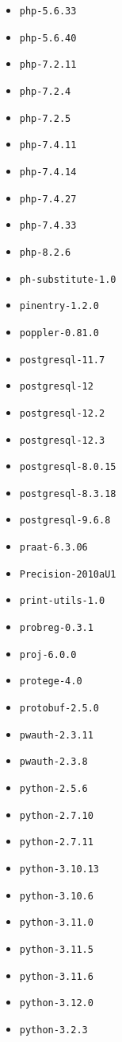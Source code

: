\begin{itemize}
\item \verb|php-5.6.33|
\item \verb|php-5.6.40|
\item \verb|php-7.2.11|
\item \verb|php-7.2.4|
\item \verb|php-7.2.5|
\item \verb|php-7.4.11|
\item \verb|php-7.4.14|
\item \verb|php-7.4.27|
\item \verb|php-7.4.33|
\item \verb|php-8.2.6|
\item \verb|ph-substitute-1.0|
\item \verb|pinentry-1.2.0|
\item \verb|poppler-0.81.0|
\item \verb|postgresql-11.7|
\item \verb|postgresql-12|
\item \verb|postgresql-12.2|
\item \verb|postgresql-12.3|
\item \verb|postgresql-8.0.15|
\item \verb|postgresql-8.3.18|
\item \verb|postgresql-9.6.8|
\item \verb|praat-6.3.06|
\item \verb|Precision-2010aU1|
\item \verb|print-utils-1.0|
\item \verb|probreg-0.3.1|
\item \verb|proj-6.0.0|
\item \verb|protege-4.0|
\item \verb|protobuf-2.5.0|
\item \verb|pwauth-2.3.11|
\item \verb|pwauth-2.3.8|
\item \verb|python-2.5.6|
\item \verb|python-2.7.10|
\item \verb|python-2.7.11|
\item \verb|python-3.10.13|
\item \verb|python-3.10.6|
\item \verb|python-3.11.0|
\item \verb|python-3.11.5|
\item \verb|python-3.11.6|
\item \verb|python-3.12.0|
\item \verb|python-3.2.3|

\end{itemize}
